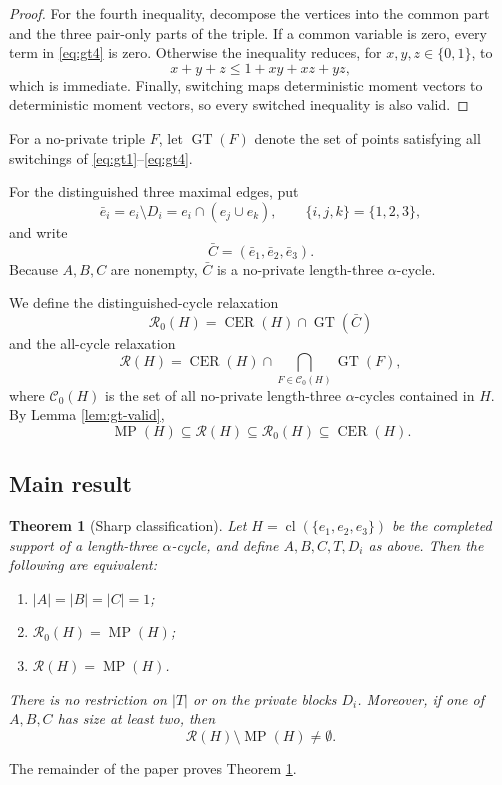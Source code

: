 \documentclass[11pt]{article}
\newtheorem{theorem}{Theorem}[section]
\theoremstyle{definition}
\theoremstyle{remark}
\newcommand{\cl}{\operatorname{cl}}
\newcommand{\MP}{\operatorname{MP}}
\newcommand{\CER}{\operatorname{CER}}
\newcommand{\GT}{\operatorname{GT}}
\newcommand{\Rdist}{\mathcal{R}_{0}}
\newcommand{\Rall}{\mathcal{R}}
\begin{document}
\begin{editedaiblock}
\begin{proof}
For the fourth inequality, decompose the vertices into the common part and the three pair-only parts of the triple. If a common variable is zero, every term in \eqref{eq:gt4} is zero. Otherwise the inequality reduces, for $x,y,z\in\{0,1\}$, to
\[
x+y+z\le 1+xy+xz+yz,
\]
which is immediate. Finally, switching maps deterministic moment vectors to deterministic moment vectors, so every switched inequality is also valid.
\end{proof}

For a no-private triple $F$, let $\GT(F)$ denote the set of points satisfying all switchings of \eqref{eq:gt1}--\eqref{eq:gt4}.

For the distinguished three maximal edges, put
\[
\bar e_i=e_i\setminus D_i=e_i\cap(e_j\cup e_k),
\qquad \{i,j,k\}=\{1,2,3\},
\]
and write
\[
\bar C=(\bar e_1,\bar e_2,\bar e_3).
\]
Because $A,B,C$ are nonempty, $\bar C$ is a no-private length-three $\alpha$-cycle.

We define the distinguished-cycle relaxation
\[
\Rdist(H)=\CER(H)\cap\GT(\bar C)
\]
and the all-cycle relaxation
\[
\Rall(H)=\CER(H)\cap\bigcap_{F\in\mathcal C_0(H)}\GT(F),
\]
where $\mathcal C_0(H)$ is the set of all no-private length-three $\alpha$-cycles contained in $H$. By Lemma \ref{lem:gt-valid},
\[
\MP(H)\subseteq\Rall(H)\subseteq\Rdist(H)\subseteq\CER(H).
\]

\subsection{Main result}

\begin{theorem}[Sharp classification]\label{thm:main}
Let $H=\cl(\{e_1,e_2,e_3\})$ be the completed support of a length-three $\alpha$-cycle, and define $A,B,C,T,D_i$ as above. Then the following are equivalent:
\begin{enumerate}
\item $|A|=|B|=|C|=1$;
\item $\Rdist(H)=\MP(H)$;
\item $\Rall(H)=\MP(H)$.
\end{enumerate}
There is no restriction on $|T|$ or on the private blocks $D_i$. Moreover, if one of $A,B,C$ has size at least two, then
\[
\Rall(H)\setminus\MP(H)\neq\emptyset.
\]
\end{theorem}

The remainder of the paper proves Theorem \ref{thm:main}.

\end{editedaiblock}
\end{document}
